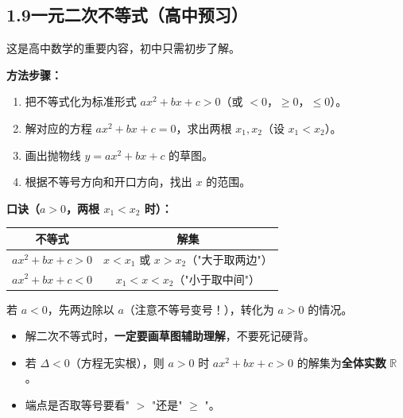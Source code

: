 \documentclass[12pt, a4paper]{ctexart}
\begin{document}
\subsection*{1.9\quad 一元二次不等式（高中预习）}

\begin{knowledgebox}[用图象法解一元二次不等式]
这是高中数学的重要内容，初中只需初步了解。\vspace{6pt}

\textbf{方法步骤：}
\begin{enumerate}[leftmargin=2em]
  \item 把不等式化为标准形式 $ax^2 + bx + c > 0$（或 $< 0$，$\geq 0$，$\leq 0$）。
  \item 解对应的方程 $ax^2 + bx + c = 0$，求出两根 $x_1, x_2$（设 $x_1 < x_2$）。
  \item 画出抛物线 $y = ax^2 + bx + c$ 的草图。
  \item 根据不等号方向和开口方向，找出 $x$ 的范围。
\end{enumerate}

\textbf{口诀（$a > 0$，两根 $x_1 < x_2$ 时）：}
\begin{center}
\renewcommand{\arraystretch}{1.5}
\begin{tabular}{|c|c|}
\hline
\textbf{不等式} & \textbf{解集} \\
\hline
$ax^2 + bx + c > 0$ & $x < x_1$ 或 $x > x_2$（"大于取两边"）\\
\hline
$ax^2 + bx + c < 0$ & $x_1 < x < x_2$（"小于取中间"）\\
\hline
\end{tabular}
\end{center}

若 $a < 0$，先两边除以 $a$（注意不等号变号！），转化为 $a > 0$ 的情况。
\end{knowledgebox}

\begin{warnbox}[特别注意]
\begin{itemize}[leftmargin=2em]
  \item 解二次不等式时，\textbf{一定要画草图辅助理解}，不要死记硬背。
  \item 若 $\Delta < 0$（方程无实根），则 $a > 0$ 时 $ax^2+bx+c > 0$ 的解集为\textbf{全体实数} $\mathbb{R}$。
  \item 端点是否取等号要看" $>$ "还是" $\geq$ "。
\end{itemize}
\end{warnbox}


\end{document}
